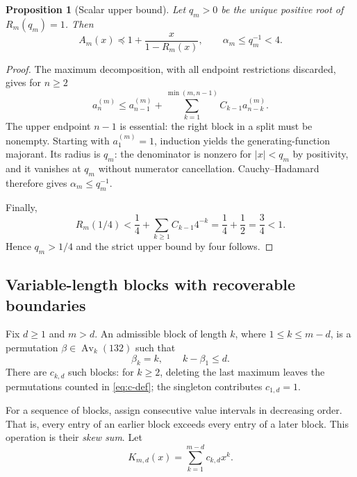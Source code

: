 \documentclass[11pt,a4paper]{article}
\newtheorem{proposition}[proposition]{Proposition}
\theoremstyle{definition}\newaliascnt{definition}{theorem}
\theoremstyle{remark}\newaliascnt{remark}{theorem}
\newcommand{\Av}{\operatorname{Av}}
\newcommand{\preceqc}{\preceq}
\begin{document}
\begin{proposition}[Scalar upper bound]\label{prop:upper}
Let $q_m>0$ be the unique positive root of $R_m(q_m)=1$. Then
\begin{equation}
 A_m(x)\preceqc 1+\frac{x}{1-R_m(x)},\qquad
 \alpha_m\le q_m^{-1}<4.
 \label{eq:upper}
\end{equation}
\end{proposition}
\begin{proof}
The maximum decomposition, with all endpoint restrictions discarded, gives
for $n\ge2$
\[
 a_n^{(m)}\le a_{n-1}^{(m)}+
 \sum_{k=1}^{\min(m,n-1)}C_{k-1}a_{n-k}^{(m)}.
\]
The upper endpoint $n-1$ is essential: the right block in a split must be
nonempty. Starting with $a_1^{(m)}=1$, induction yields the generating-function
majorant. Its radius is $q_m$: the denominator is nonzero for $|x|<q_m$
by positivity, and it vanishes at $q_m$ without numerator cancellation.
Cauchy--Hadamard therefore gives $\alpha_m\le q_m^{-1}$.

Finally,
\[
 R_m(1/4)<\frac14+\sum_{k\ge1}C_{k-1}4^{-k}
          =\frac14+\frac12=\frac34<1.
\]
Hence $q_m>1/4$ and the strict upper bound by four follows.
\end{proof}

\subsection{Variable-length blocks with recoverable boundaries}
Fix $d\ge1$ and $m>d$. An admissible block of length $k$, where
$1\le k\le m-d$, is a permutation $\beta\in\Av_k(132)$ such that
\[
 \beta_k=k,\qquad k-\beta_1\le d.
\]
There are $c_{k,d}$ such blocks: for $k\ge2$, deleting the last maximum
leaves the permutations counted in \eqref{eq:c-def}; the singleton contributes
$c_{1,d}=1$.

For a sequence of blocks, assign consecutive value intervals in decreasing
order. That is, every entry of an earlier block exceeds every entry of a
later block. This operation is their \emph{skew sum}. Let
\begin{equation}
 K_{m,d}(x)=\sum_{k=1}^{m-d}c_{k,d}x^k.
 \label{eq:K}
\end{equation}
\end{document}

